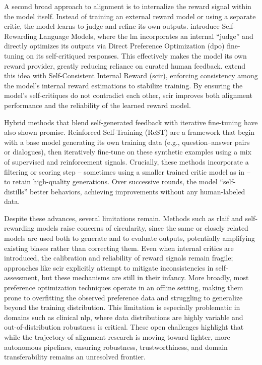A second broad approach to alignment is to internalize the reward signal within the model itself. Instead of training an external reward model or using a separate critic, the model learns to judge and refine its own outputs. \citet{yuan2024selfrewarding} introduce Self-Rewarding Language Models, where the \gls{lm} incorporates an internal “judge” and directly optimizes its outputs via Direct Preference Optimization (\gls{dpo}) fine-tuning on its self-critiqued responses. This effectively makes the model its own reward provider, greatly reducing reliance on curated human feedback. \citet{zhou2025scir} extend this idea with Self-Consistent Internal Reward (\gls{scir}), enforcing consistency among the model’s internal reward estimations to stabilize training. By ensuring the model’s self-critiques do not contradict each other, \gls{scir} improves both alignment performance and the reliability of the learned reward model.

Hybrid methods that blend self-generated feedback with iterative fine-tuning have also shown promise. Reinforced Self-Training (ReST) \citep{gulcehre2023rest} are a framework that begin with a base model generating its own training data (e.g., question–answer pairs or dialogues), then iteratively fine-tune on these synthetic examples using a mix of supervised and reinforcement signals. Crucially, these methods incorporate a filtering or scoring step – sometimes using a smaller trained critic model as in \citet{li2023cappy} – to retain high-quality generations. Over successive rounds, the model “self-distills” better behaviors, achieving improvements without any human-labeled data.

Despite these advances, several limitations remain. Methods such as \gls{rlaif} and self-rewarding models raise concerns of circularity, since the same or closely related models are used both to generate and to evaluate outputs, potentially amplifying existing biases rather than correcting them. Even when internal critics are introduced, the calibration and reliability of reward signals remain fragile; approaches like \gls{scir} explicitly attempt to mitigate inconsistencies in self-assessment, but these mechanisms are still in their infancy. More broadly, most preference optimization techniques operate in an offline setting, making them prone to overfitting the observed preference data and struggling to generalize beyond the training distribution. This limitation is especially problematic in domains such as clinical \gls{nlp}, where data distributions are highly variable and out-of-distribution robustness is critical. These open challenges highlight that while the trajectory of alignment research is moving toward lighter, more autonomous pipelines, ensuring robustness, trustworthiness, and domain transferability remains an unresolved frontier.

